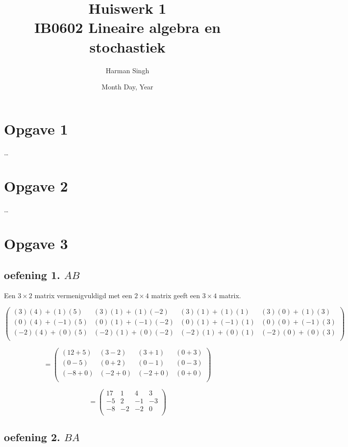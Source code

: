 \documentclass[11pt, a4paper]{article}
\title{Huiswerk 1 \\ IB0602 Lineaire algebra en stochastiek}
\author{Harman Singh}
\date{Month Day, Year}
\begin{document}
\maketitle

\pagebreak
\section*{Opgave 1}
\ldots



\pagebreak
\section*{Opgave 2}
\ldots




\pagebreak
\section*{Opgave 3}
\subsection*{oefening 1. $AB$}

Een $3\times2$ matrix vermenigvuldigd met een $2\times4$ matrix geeft een $3\times4$ matrix.

\[
\begin{pmatrix}
 (3)(4)+(1)(5) & (3)(1)+(1)(-2) & (3)(1)+(1)(1) & (3)(0)+(1)(3) \\
 (0)(4)+(-1)(5) & (0)(1)+(-1)(-2) & (0)(1)+(-1)(1) & (0)(0)+(-1)(3) \\
 (-2)(4)+(0)(5) & (-2)(1)+(0)(-2) & (-2)(1)+(0)(1) & (-2)(0)+(0)(3) \\
\end{pmatrix}
\]

\[
= \begin{pmatrix}
 (12+5) & (3-2) & (3+1) & (0+3) \\
 (0-5) & (0+2) & (0-1) & (0-3) \\
 (-8+0) & (-2+0) & (-2+0) & (0+0) \\
\end{pmatrix}
\]

\[
= \begin{pmatrix}
 17 & 1 & 4 & 3 \\
 -5 & 2 & -1 & -3 \\
 -8 & -2 & -2 & 0 \\
\end{pmatrix}
\]


\subsection*{oefening 2. $BA$}
\end{document}
